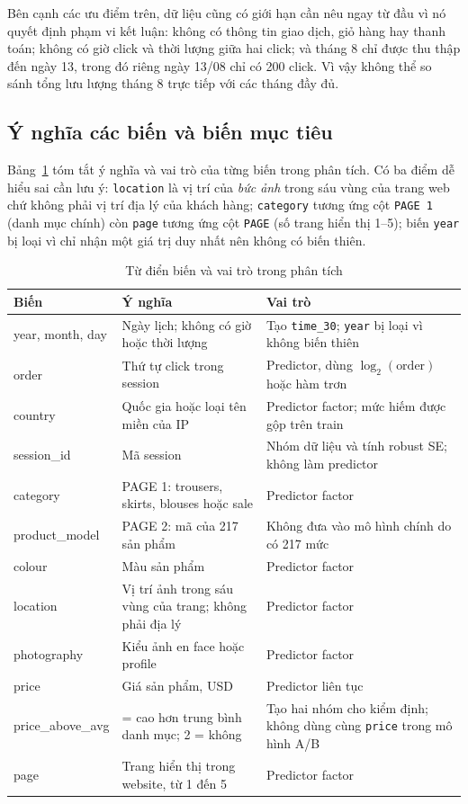 Bên cạnh các ưu điểm trên, dữ liệu cũng có giới hạn cần nêu ngay từ đầu vì nó
quyết định phạm vi kết luận: không có thông tin giao dịch, giỏ hàng hay thanh
toán; không có giờ click và thời lượng giữa hai click; và tháng 8 chỉ được thu
thập đến ngày 13, trong đó riêng ngày 13/08 chỉ có 200 click. Vì vậy không thể so
sánh tổng lưu lượng tháng 8 trực tiếp với các tháng đầy đủ.

\subsection{Ý nghĩa các biến và biến mục tiêu}

Bảng~\ref{tab:vardict} tóm tắt ý nghĩa và vai trò của từng biến trong phân tích.
Có ba điểm dễ hiểu sai cần lưu ý: \texttt{location} là vị trí của \emph{bức ảnh}
trong sáu vùng của trang web chứ không phải vị trí địa lý của khách hàng;
\texttt{category} tương ứng cột \texttt{PAGE 1} (danh mục chính) còn
\texttt{page} tương ứng cột \texttt{PAGE} (số trang hiển thị 1--5); biến
\texttt{year} bị loại vì chỉ nhận một giá trị duy nhất nên không có biến thiên.

\begin{table}[H]
\centering
\caption{Từ điển biến và vai trò trong phân tích}
\label{tab:vardict}
\footnotesize
\begin{tabular}{>{\raggedright\arraybackslash}p{}
                >{\raggedright\arraybackslash}p{}
                >{\raggedright\arraybackslash}p{}}
\toprule
\textbf{Biến} & \textbf{Ý nghĩa} & \textbf{Vai trò} \\
\midrule
year, month, day & Ngày lịch; không có giờ hoặc thời lượng & Tạo \texttt{time\_30}; \texttt{year} bị loại vì không biến thiên \\[2pt]
order & Thứ tự click trong session & Predictor, dùng $\log_2(\text{order})$ hoặc hàm trơn \\[2pt]
country & Quốc gia hoặc loại tên miền của IP & Predictor factor; mức hiếm được gộp trên train \\[2pt]
session\_id & Mã session & Nhóm dữ liệu và tính robust SE; không làm predictor \\[2pt]
category & PAGE 1: trousers, skirts, blouses hoặc sale & Predictor factor \\[2pt]
product\_model & PAGE 2: mã của 217 sản phẩm & Không đưa vào mô hình chính do có 217 mức \\[2pt]
colour & Màu sản phẩm & Predictor factor \\[2pt]
location & Vị trí ảnh trong sáu vùng của trang; không phải địa lý & Predictor factor \\[2pt]
photography & Kiểu ảnh en face hoặc profile & Predictor factor \\[2pt]
price & Giá sản phẩm, USD & Predictor liên tục \\[2pt]
price\_above\_avg & 1 = cao hơn trung bình danh mục; 2 = không & Tạo hai nhóm cho kiểm định; không dùng cùng \texttt{price} trong mô hình A/B \\[2pt]
page & Trang hiển thị trong website, từ 1 đến 5 & Predictor factor \\
\bottomrule
\end{tabular}
\end{table}

